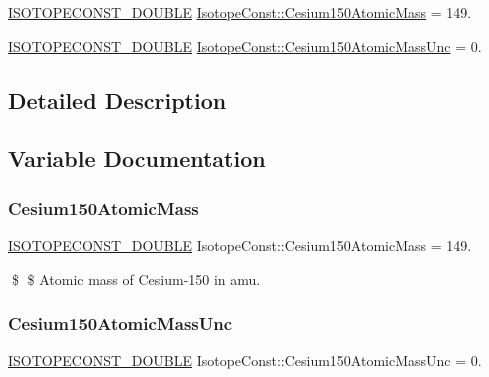 \begin{DoxyCompactItemize}
\item 
\mbox{\hyperlink{group___isotope_const-_macros_ga8f45a7272ce02c0b4c65c44636ed719a}{I\+S\+O\+T\+O\+P\+E\+C\+O\+N\+S\+T\+\_\+\+D\+O\+U\+B\+LE}} \mbox{\hyperlink{group___isotope_const-_cesium-_cs150_ga05c35f7655f7644acfb1c83cce464cb5}{Isotope\+Const\+::\+Cesium150\+Atomic\+Mass}} = 149.
\item 
\mbox{\hyperlink{group___isotope_const-_macros_ga8f45a7272ce02c0b4c65c44636ed719a}{I\+S\+O\+T\+O\+P\+E\+C\+O\+N\+S\+T\+\_\+\+D\+O\+U\+B\+LE}} \mbox{\hyperlink{group___isotope_const-_cesium-_cs150_ga472cb4ad20431d99ca5644cdc9d59ae1}{Isotope\+Const\+::\+Cesium150\+Atomic\+Mass\+Unc}} = 0.
\end{DoxyCompactItemize}


\subsection{Detailed Description}


\subsection{Variable Documentation}
\mbox{\label{group___isotope_const-_cesium-_cs150_ga05c35f7655f7644acfb1c83cce464cb5}} 
\subsubsection{\texorpdfstring{Cesium150\+Atomic\+Mass}{Cesium150AtomicMass}}
{\footnotesize\ttfamily \mbox{\hyperlink{group___isotope_const-_macros_ga8f45a7272ce02c0b4c65c44636ed719a}{I\+S\+O\+T\+O\+P\+E\+C\+O\+N\+S\+T\+\_\+\+D\+O\+U\+B\+LE}} Isotope\+Const\+::\+Cesium150\+Atomic\+Mass = 149.}

\$ \$ Atomic mass of Cesium-\/150 in amu. \mbox{\label{group___isotope_const-_cesium-_cs150_ga472cb4ad20431d99ca5644cdc9d59ae1}} 
\subsubsection{\texorpdfstring{Cesium150\+Atomic\+Mass\+Unc}{Cesium150AtomicMassUnc}}
{\footnotesize\ttfamily \mbox{\hyperlink{group___isotope_const-_macros_ga8f45a7272ce02c0b4c65c44636ed719a}{I\+S\+O\+T\+O\+P\+E\+C\+O\+N\+S\+T\+\_\+\+D\+O\+U\+B\+LE}} Isotope\+Const\+::\+Cesium150\+Atomic\+Mass\+Unc = 0.}

